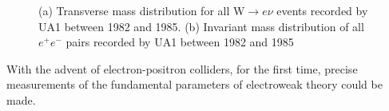 \begin{figure}
\centering%
\caption{(a) Transverse mass distribution for all W$\to e \nu$ events recorded by UA1 between 1982 and 1985. (b) Invariant mass distribution of all $e^+e^-$
pairs recorded by UA1 between 1982 and 1985}
\label{rubbia_f}
\end{figure}
With the advent of electron-positron colliders, for the first time, precise measurements of the fundamental parameters of electroweak theory could be made. 
